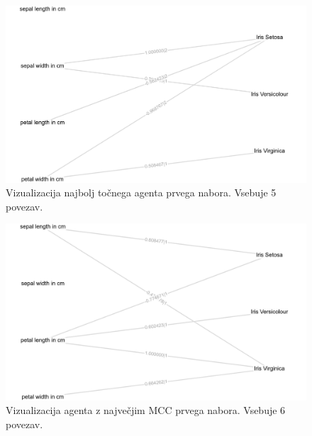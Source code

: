 \begin{figure}[H]
    \begin{center}
        \includegraphics[width=13cm]{iris/1/acc_g}
    \end{center}
    \caption{Vizualizacija najbolj točnega agenta prvega nabora. Vsebuje 5 povezav.}
    \label{fig:iris_acc_1_g}
\end{figure}

\begin{figure}[H]
    \begin{center}
        \includegraphics[width=13cm]{iris/1/mcc_g}
    \end{center}
    \caption{Vizualizacija agenta z največjim MCC prvega nabora. Vsebuje 6 povezav.}
    \label{fig:iris_mcc_1_g}
\end{figure}

